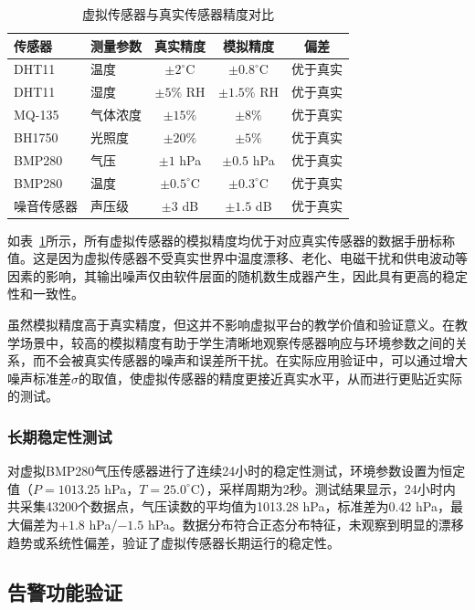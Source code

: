 \documentclass[12pt,a4paper]{ctexart}
\begin{document}
\begin{table}[H]
    \centering
    \caption{虚拟传感器与真实传感器精度对比}
    \label{tab:precision}
    \begin{tabular}{@{}llccc@{}}
        \toprule
        \textbf{传感器} & \textbf{测量参数} & \textbf{真实精度} & \textbf{模拟精度} & \textbf{偏差} \\
        \midrule
        DHT11 & 温度 & $\pm 2^\circ$C & $\pm 0.8^\circ$C & 优于真实 \\
        DHT11 & 湿度 & $\pm 5\%$ RH & $\pm 1.5\%$ RH & 优于真实 \\
        MQ-135 & 气体浓度 & $\pm 15\%$ & $\pm 8\%$ & 优于真实 \\
        BH1750 & 光照度 & $\pm 20\%$ & $\pm 5\%$ & 优于真实 \\
        BMP280 & 气压 & $\pm 1$ hPa & $\pm 0.5$ hPa & 优于真实 \\
        BMP280 & 温度 & $\pm 0.5^\circ$C & $\pm 0.3^\circ$C & 优于真实 \\
        噪音传感器 & 声压级 & $\pm 3$ dB & $\pm 1.5$ dB & 优于真实 \\
        \bottomrule
    \end{tabular}
\end{table}

如表~\ref{tab:precision}所示，所有虚拟传感器的模拟精度均优于对应真实传感器的数据手册标称值。这是因为虚拟传感器不受真实世界中温度漂移、老化、电磁干扰和供电波动等因素的影响，其输出噪声仅由软件层面的随机数生成器产生，因此具有更高的稳定性和一致性。

虽然模拟精度高于真实精度，但这并不影响虚拟平台的教学价值和验证意义。在教学场景中，较高的模拟精度有助于学生清晰地观察传感器响应与环境参数之间的关系，而不会被真实传感器的噪声和误差所干扰。在实际应用验证中，可以通过增大噪声标准差$\sigma$的取值，使虚拟传感器的精度更接近真实水平，从而进行更贴近实际的测试。

\subsubsection{长期稳定性测试}

对虚拟BMP280气压传感器进行了连续24小时的稳定性测试，环境参数设置为恒定值（$P = 1013.25$ hPa，$T = 25.0^\circ$C），采样周期为2秒。测试结果显示，24小时内共采集43200个数据点，气压读数的平均值为1013.28 hPa，标准差为0.42 hPa，最大偏差为$+1.8$ hPa/$-1.5$ hPa。数据分布符合正态分布特征，未观察到明显的漂移趋势或系统性偏差，验证了虚拟传感器长期运行的稳定性。

\subsection{告警功能验证}
\end{document}
